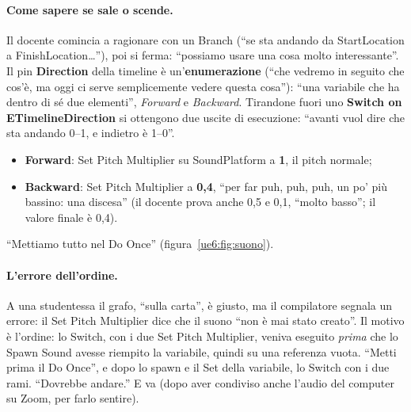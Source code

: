 \paragraph{Come sapere se sale o scende.} Il docente comincia a ragionare con un Branch
(``se sta andando da StartLocation a FinishLocation\ldots''), poi si ferma: ``possiamo
usare una cosa molto interessante''. Il pin \textbf{Direction} della timeline è
un'\textbf{enumerazione} (``che vedremo in seguito che cos'è, ma oggi ci serve
semplicemente vedere questa cosa''): ``una variabile che ha dentro di sé due elementi'',
\emph{Forward} e \emph{Backward}. Tirandone fuori uno \textbf{Switch on
ETimelineDirection} si ottengono due uscite di esecuzione: ``avanti vuol dire che sta
andando 0--1, e indietro è 1--0''.
\begin{itemize}
  \item \textbf{Forward}: Set Pitch Multiplier su SoundPlatform a \textbf{1}, il pitch
        normale;
  \item \textbf{Backward}: Set Pitch Multiplier a \textbf{0,4}, ``per far puh, puh, puh,
        un po' più bassino: una discesa'' (il docente prova anche 0,5 e 0,1, ``molto
        basso''; il valore finale è 0,4).
\end{itemize}
``Mettiamo tutto nel Do Once'' (figura~\ref{ue6:fig:suono}).

\paragraph{L'errore dell'ordine.} A una studentessa il grafo, ``sulla carta'', è giusto,
ma il compilatore segnala un errore: il Set Pitch Multiplier dice che il suono ``non è
mai stato creato''. Il motivo è l'ordine: lo Switch, con i due Set Pitch Multiplier,
veniva eseguito \emph{prima} che lo Spawn Sound avesse riempito la variabile, quindi su
una referenza vuota. ``Metti prima il Do Once'', e dopo lo spawn e il Set della
variabile, lo Switch con i due rami. ``Dovrebbe andare.'' E va (dopo aver condiviso anche
l'audio del computer su Zoom, per farlo sentire).

